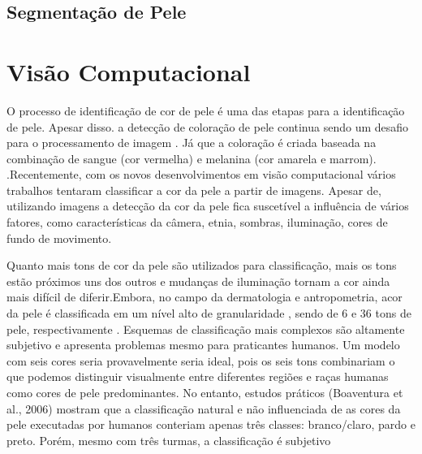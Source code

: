 \subsection{Segmentação de Pele}
\section{Visão Computacional}


O processo de identificação de cor de pele é uma das etapas para a identificação de pele. Apesar disso. a detecção de coloração de pele continua sendo um desafio para o processamento de imagem \cite{Human_Skin_Color_Detection_Technique_Using_Different_Color_Models}. Já que a coloração é criada baseada na combinação de sangue (cor vermelha) e melanina (cor amarela e marrom). \cite{Human_Skin_Color_Detection_Technique_Using_Different_Color_Models}.Recentemente, com os novos desenvolvimentos em visão computacional vários trabalhos tentaram classificar a cor da pele a partir de imagens. Apesar de, utilizando imagens a detecção da cor da pele fica suscetível a influência de vários fatores, como características da câmera, etnia, sombras, iluminação, cores de fundo de movimento\cite{Human_Skin_Detection_Using_Different_Color_Spaces}.
 
Quanto mais tons de cor da pele são utilizados para classificação, mais os tons estão próximos uns dos outros e mudanças de iluminação tornam a cor ainda mais difícil de diferir.Embora, no campo da dermatologia e antropometria, acor da pele é classificada em um nível alto de granularidade , sendo de 6 e 36 tons de pele, respectivamente \cite{Automatic_Skin_Tone_Extraction_for_Visagism_Applications}. Esquemas de classificação mais complexos são altamente subjetivo e apresenta problemas mesmo para
praticantes humanos. Um modelo com seis cores seria provavelmente seria ideal, pois os seis tons combinariam
o que podemos distinguir visualmente entre diferentes
regiões e raças humanas como cores de pele predominantes.
No entanto, estudos práticos (Boaventura et al., 2006)
mostram que a classificação natural e não influenciada de
as cores da pele executadas por humanos conteriam
apenas três classes: branco/claro, pardo e preto.
Porém, mesmo com três turmas, a classificação é
subjetivo




\label{cap:fundamentacao-teorica}